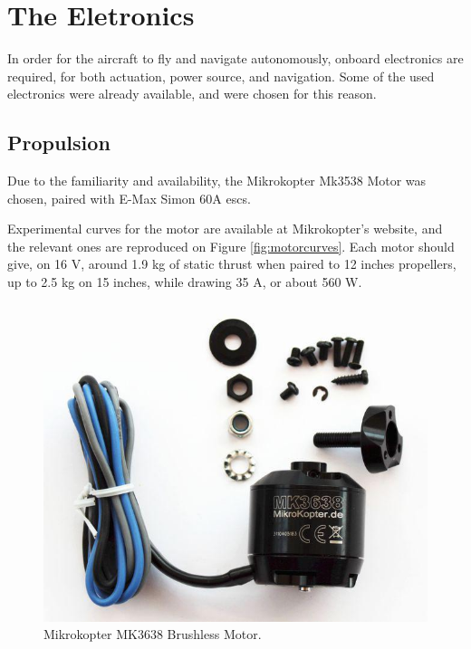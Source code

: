 
\chapter{The Eletronics} \label{chap:electronics}

In order for the aircraft to fly and navigate autonomously, onboard electronics are required, for both actuation, power source, and navigation. Some of the used electronics were already available, and were chosen for this reason.
	
\section{Propulsion}

Due to the familiarity and availability, the Mikrokopter Mk3538 Motor was chosen, paired with E-Max Simon 60A escs.

Experimental curves for the motor are available at Mikrokopter's website, and the relevant ones are reproduced on Figure \ref{fig:motorcurves}. Each motor should give, on 16 V, around 1.9 kg of static thrust when paired to 12 inches propellers, up to 2.5 kg on 15 inches, while drawing 35 A, or about 560 W.

\begin{figure}[H]
\centering
  \includegraphics[width=0.8\linewidth]{figs/mk3638.jpg}
  \caption{Mikrokopter MK3638 Brushless Motor.}
  \label{fig:yaw_loop}
\end{figure}

